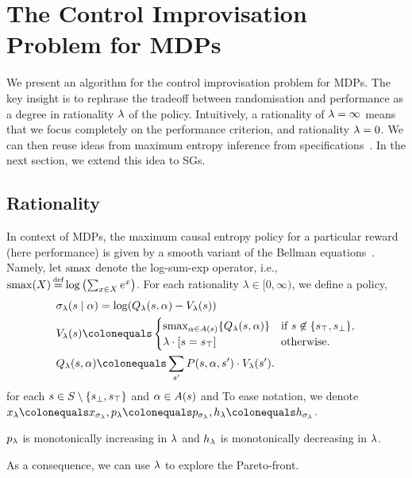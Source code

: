 
\section{The Control Improvisation Problem for MDPs}
\label{sec:mdps}

We present an algorithm for the control improvisation problem for
MDPs. The key insight is to rephrase the tradeoff between
randomisation and performance as a degree in rationality $\lambda$ of the
policy. Intuitively, a rationality of $\lambda = \infty$ means that we
focus completely on the performance criterion, and rationality $\lambda =
0$. We can then reuse ideas from maximum entropy inference from
specifications~\cite{DBLP:conf/cav/Vazquez-Chanlatte20}.  In the next
section, we extend this idea to SGs.

\subsection{Rationality}

\noindent
In context of MDPs, the maximum causal entropy policy for a particular
reward (here performance) is given by a smooth variant of the Bellman
equations~\cite{mceThesis}. Namely, let $\mathrm{smax}{}$ denote the
log-sum-exp operator, i.e., $\smoothmax(X) \eqdef \log \left(
\sum_{x\in X} e^x \right)$. For each rationality $\lambda \in [0,
\infty)$, we define a policy,
 \begin{align}
   &\sched_\rat(s\mid \act) = \log( Q_\rat(s,\act) - V_\rat(s))  \\
	& V_\rat(s) \colonequals  \begin{cases} \smoothmax_{\act \in \EnAct(s)}{\{  Q_\rat(s,\act) \}} & \text{if }s \not\in \{ \target, \sink \}, \\ \lambda  \cdot \indicator{s = \target} & \text{otherwise.}  \end{cases}\\ 
	& Q_\rat(s, \act) \colonequals \sum_{s'} P(s,\act,s') \cdot V_\rat(s').
 \end{align}
 for each $s \in S \setminus \{ s_{\bot}, s_{\top} \}$ and $\alpha \in A(s)$ and
To ease notation, we denote $x_\rat \colonequals x_{\sched_\rat}, \scp_\rat \colonequals \scp_{\sched_\rat}, \rndp_\rat \colonequals \rndp_{\sched_\rat}$.

\begin{proposition}
$p_\lambda$ is monotonically increasing in $\lambda$ and $h_\lambda$ is monotonically decreasing in $\lambda$.	
\end{proposition}
As a consequence, we can use $\lambda$ to explore the Pareto-front. 


